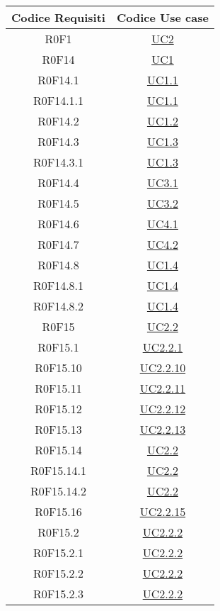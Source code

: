 \documentclass[../AnalisiDeiRequisiti.tex]{subfiles}
\begin{document}
\begin{longtable}{|c|c|}
	\hline
	\textbf{Codice Requisiti} & \textbf{Codice Use case} \\
	\hline
	\endhead
	R0F1 & \hyperlink{UC2}{UC2}\\\hline
	R0F14 & \hyperlink{UC1}{UC1}\\\hline
	R0F14.1 & \hyperlink{UC1.1}{UC1.1}\\\hline
	R0F14.1.1 & \hyperlink{UC1.1}{UC1.1}\\\hline
	R0F14.2 & \hyperlink{UC1.2}{UC1.2}\\\hline
	R0F14.3 & \hyperlink{UC1.3}{UC1.3}\\\hline
	R0F14.3.1 & \hyperlink{UC1.3}{UC1.3}\\\hline
	R0F14.4 & \hyperlink{UC3.1}{UC3.1}\\\hline
	R0F14.5 & \hyperlink{UC3.2}{UC3.2}\\\hline
	R0F14.6 & \hyperlink{UC4.1}{UC4.1}\\\hline
	R0F14.7 & \hyperlink{UC4.2}{UC4.2}\\\hline
	R0F14.8 & \hyperlink{UC1.4}{UC1.4}\\\hline
	R0F14.8.1 & \hyperlink{UC1.4}{UC1.4}\\\hline
	R0F14.8.2 & \hyperlink{UC1.4}{UC1.4}\\\hline
	R0F15 & \hyperlink{UC2.2}{UC2.2}\\\hline
	R0F15.1 & \hyperlink{UC2.2.1}{UC2.2.1}\\\hline
	R0F15.10 & \hyperlink{UC2.2.10}{UC2.2.10}\\\hline
	R0F15.11 & \hyperlink{UC2.2.11}{UC2.2.11}\\\hline
	R0F15.12 & \hyperlink{UC2.2.12}{UC2.2.12}\\\hline
	R0F15.13 & \hyperlink{UC2.2.13}{UC2.2.13}\\\hline
	R0F15.14 & \hyperlink{UC2.2}{UC2.2}\\\hline
	R0F15.14.1 & \hyperlink{UC2.2}{UC2.2}\\\hline
	R0F15.14.2 & \hyperlink{UC2.2}{UC2.2}\\\hline
	R0F15.16 & \hyperlink{UC2.2.15}{UC2.2.15}\\\hline
	R0F15.2 & \hyperlink{UC2.2.2}{UC2.2.2}\\\hline
	R0F15.2.1 & \hyperlink{UC2.2.2}{UC2.2.2}\\\hline
	R0F15.2.2 & \hyperlink{UC2.2.2}{UC2.2.2}\\\hline
	R0F15.2.3 & \hyperlink{UC2.2.2}{UC2.2.2}\\\hline

\end{longtable}
\end{document}
